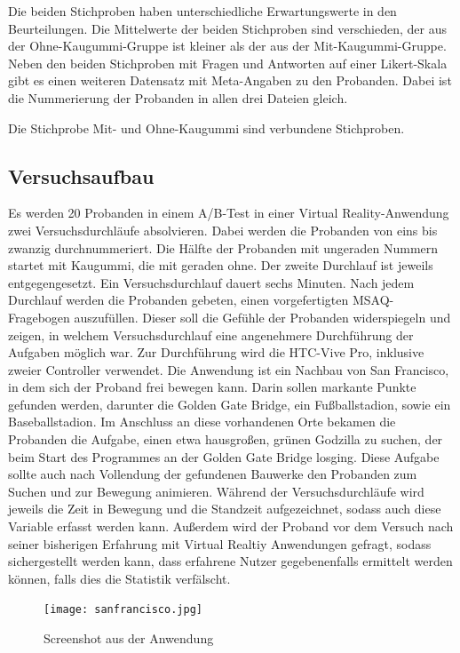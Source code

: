 \documentclass[conference, 12pt]{IEEEtran}
\begin{document}
Die beiden Stichproben haben unterschiedliche Erwartungswerte in den Beurteilungen. Die Mittelwerte der beiden Stichproben sind verschieden, der aus der Ohne-Kaugummi-Gruppe ist kleiner als der aus der Mit-Kaugummi-Gruppe. Neben den beiden Stichproben mit Fragen und Antworten auf einer Likert-Skala gibt es einen weiteren Datensatz mit Meta-Angaben zu den Probanden. Dabei ist die Nummerierung der Probanden in allen drei Dateien gleich.

Die Stichprobe Mit- und Ohne-Kaugummi sind verbundene Stichproben.

\subsection{Versuchsaufbau}
Es werden 20 Probanden in einem A/B-Test in einer Virtual Reality-Anwendung zwei Versuchsdurchläufe absolvieren. Dabei werden die Probanden von eins bis zwanzig durchnummeriert. Die Hälfte der Probanden mit ungeraden Nummern startet mit Kaugummi, die mit geraden ohne. Der zweite Durchlauf ist jeweils entgegengesetzt. Ein Versuchsdurchlauf dauert sechs Minuten. Nach jedem Durchlauf werden die Probanden gebeten, einen vorgefertigten MSAQ-Fragebogen auszufüllen. Dieser soll die Gefühle der Probanden widerspiegeln und zeigen, in welchem Versuchsdurchlauf eine angenehmere Durchführung der Aufgaben möglich war. Zur Durchführung wird die HTC-Vive Pro, inklusive zweier Controller verwendet. Die Anwendung ist ein Nachbau von San Francisco, in dem sich der Proband frei bewegen kann. Darin sollen markante Punkte gefunden werden, darunter die Golden Gate Bridge, ein Fußballstadion, sowie ein Baseballstadion. Im Anschluss an diese vorhandenen Orte bekamen die Probanden die Aufgabe, einen etwa hausgroßen, grünen Godzilla zu suchen, der beim Start des Programmes an der Golden Gate Bridge losging. Diese Aufgabe sollte auch nach Vollendung der gefundenen Bauwerke den Probanden zum Suchen und zur Bewegung animieren. Während der Versuchsdurchläufe wird jeweils die Zeit in Bewegung und die Standzeit aufgezeichnet, sodass auch diese Variable erfasst werden kann. Außerdem wird der Proband vor dem Versuch nach seiner bisherigen Erfahrung mit Virtual Realtiy Anwendungen gefragt, sodass sichergestellt werden kann, dass erfahrene Nutzer gegebenenfalls ermittelt werden können, falls dies die Statistik verfälscht. 
\\
\begin{figure}
	\centering
	\texttt{[image: sanfrancisco.jpg]}
	\caption{Screenshot aus der Anwendung}
	\label{img:screenshot}
\end{figure}
\end{document}
